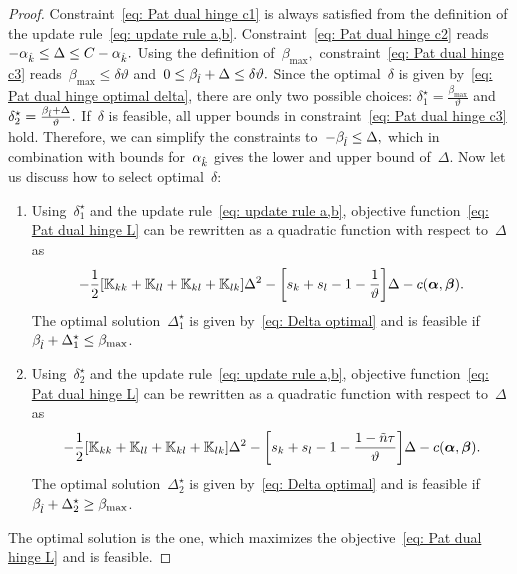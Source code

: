 \begin{proof}
  Constraint~\eqref{eq: Pat dual hinge c1} is always satisfied from the definition of the update rule~\eqref{eq: update rule a,b}. Constraint~\eqref{eq: Pat dual hinge c2} reads~$- \alpha_{\hat{k}} \leq \Delta \leq C - \alpha_{\hat{k}}.$ Using the definition of~$\beta_{\max},$ constraint~\eqref{eq: Pat dual hinge c3} reads~$\beta_{\max} \leq \delta \vartheta$ and~$0 \leq \beta_{\hat{l}} + \Delta \leq \delta \vartheta.$ Since the optimal~$\delta$ is given by~\eqref{eq: Pat dual hinge optimal delta}, there are only two possible choices: $\delta^{\star}_1 = \frac{\beta_{\max}}{\vartheta}$ and~$\delta^{\star}_2 = \frac{\beta_{\hat{l}} + \Delta}{\vartheta}.$ If~$\delta$ is feasible, all upper bounds in constraint~\eqref{eq: Pat dual hinge c3} hold. Therefore, we can simplify the constraints to~$- \beta_{\hat{l}} \leq \Delta,$ which in combination with bounds for~$\alpha_{\hat{k}}$ gives the lower and upper bound of~$\Delta.$ Now let us discuss how to select optimal~$\delta:$
  \begin{enumerate}
    \item Using~$\delta^{\star}_1$ and the update rule~\eqref{eq: update rule a,b}, objective function~\eqref{eq: Pat dual hinge L} can be rewritten as a quadratic function with respect to~$\Delta$ as
    \begin{equation*}
      - \frac{1}{2} \Brac[s]{\K_{kk} + \K_{ll} + \K_{kl} + \K_{lk}} \Delta^2
      - \Brac[s]{s_k + s_l - 1 - \frac{1}{\vartheta}} \Delta
      - c(\bm{\alpha}, \bm{\beta}).
    \end{equation*}
    The optimal solution~$\Delta^{\star}_1$ is given by~\eqref{eq: Delta optimal} and is feasible if~$\beta_{\hat{l}} + \Delta^{\star}_1 \leq \beta_{\max}$.

    \item Using~$\delta^{\star}_2$ and the update rule~\eqref{eq: update rule a,b}, objective function~\eqref{eq: Pat dual hinge L} can be rewritten as a quadratic function with respect to~$\Delta$ as
    \begin{equation*}
      - \frac{1}{2} \Brac[s]{\K_{kk} + \K_{ll} + \K_{kl} + \K_{lk}} \Delta^2
      - \Brac[s]{s_k + s_l - 1 - \frac{1 - \ntil \tau}{\vartheta}} \Delta
      - c(\bm{\alpha}, \bm{\beta}).
    \end{equation*}
    The optimal solution~$\Delta^{\star}_2$ is given by~\eqref{eq: Delta optimal} and is feasible if~$\beta_{\hat{l}} + \Delta^{\star}_2 \geq \beta_{\max}$.
  \end{enumerate}
  The optimal solution is the one, which maximizes the objective~\eqref{eq: Pat dual hinge L} and is feasible.
\end{proof}

